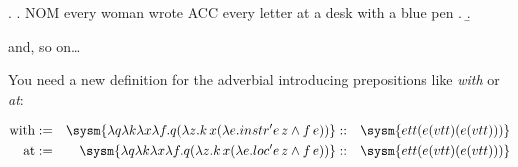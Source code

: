 \documentclass[10pt,a4paper]{exam}
\begin{document}
\begin{questions}
\ex.
\a. NOM every woman wrote ACC every letter at a desk with a blue pen .
\b. 


and, so on\ldots

\begin{solution}
	You need a new definition for the adverbial introducing prepositions like \emph{with} or \emph{at}:

\begin{align*}
	\text{with}  &:=& \sysm{\lambda q \lambda k \lambda x \lambda f . q (\lambda z . k\, x (\lambda e . instr' e\, z \land f\, e)) } &::&
	\sysm{ett(e(vtt)(e(vtt)))}\\
	\text{at}   &:=& \sysm{\lambda q \lambda k \lambda x \lambda f . q (\lambda z . k\, x (\lambda e . loc' e\, z \land f\, e)) } &::&
	\sysm{ett(e(vtt)(e(vtt)))}\\
\end{align*}
\end{solution}

\end{questions}
\end{document}
